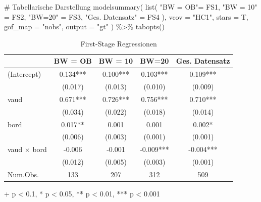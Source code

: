 \documentclass[
  a4paper,
  DIV=11,
  oneside]{scrreprt}
\newenvironment{Shaded}{\begin{snugshade}}{\end{snugshade}}
\newcommand{\AttributeTok}[1]{\textcolor[rgb]{0.40,0.45,0.13}{#1}}
\newcommand{\CommentTok}[1]{\textcolor[rgb]{0.37,0.37,0.37}{#1}}
\newcommand{\FunctionTok}[1]{\textcolor[rgb]{0.28,0.35,0.67}{#1}}
\newcommand{\NormalTok}[1]{\textcolor[rgb]{0.00,0.23,0.31}{#1}}
\newcommand{\OtherTok}[1]{\textcolor[rgb]{0.00,0.23,0.31}{#1}}
\newcommand{\SpecialCharTok}[1]{\textcolor[rgb]{0.37,0.37,0.37}{#1}}
\newcommand{\StringTok}[1]{\textcolor[rgb]{0.13,0.47,0.30}{#1}}
\begin{document}
\begin{Shaded}
\begin{Highlighting}[]
\CommentTok{\# Tabellarische Darstellung}
\FunctionTok{modelsummary}\NormalTok{(}
  \FunctionTok{list}\NormalTok{(}
    \StringTok{"BW = OB"}\OtherTok{=}\NormalTok{ FS1, }
    \StringTok{"BW = 10"} \OtherTok{=}\NormalTok{ FS2, }
    \StringTok{"BW=20"} \OtherTok{=}\NormalTok{ FS3, }
    \StringTok{"Ges. Datensatz"} \OtherTok{=}\NormalTok{ FS4}
\NormalTok{  ), }
  \AttributeTok{vcov =} \StringTok{"HC1"}\NormalTok{, }
  \AttributeTok{stars =}\NormalTok{ T, }
  \AttributeTok{gof\_map =} \StringTok{"nobs"}\NormalTok{, }
  \AttributeTok{output =} \StringTok{"gt"}
\NormalTok{) }\SpecialCharTok{\%\textgreater{}\%}
  \FunctionTok{tabopts}\NormalTok{()}
\end{Highlighting}
\end{Shaded}

\hypertarget{tbl-BastenBetzFS}{}
{
\makeatletter
\def\LT@makecaption#1#2#3{%
  \noalign{\smash{\hbox{\kern\textwidth\rlap{\kern\marginparsep
  \parbox[t]{\marginparwidth}{%
    \footnotesize{%
      \vspace{(1.1\baselineskip)}
    #1{#2: }\ignorespaces #3}}}}}}%
    }
\makeatother

\setlength{\LTpost}{0mm}
\begin{longtable}{lcccc}
\caption{\label{tbl-BastenBetzFS}First-Stage Regressionen }\tabularnewline

\toprule
  & BW = OB & BW = 10 & BW=20 & Ges. Datensatz \\ 
\midrule\addlinespace[2.5pt]
(Intercept) & 0.134*** & 0.100*** & 0.103*** & 0.109*** \\ 
 & (0.017) & (0.013) & (0.010) & (0.009) \\ 
vaud & 0.671*** & 0.726*** & 0.756*** & 0.710*** \\ 
 & (0.034) & (0.022) & (0.018) & (0.014) \\ 
bord & 0.017** & 0.001 & 0.001 & 0.002* \\ 
 & (0.006) & (0.003) & (0.001) & (0.001) \\ 
vaud × bord & -0.006 & -0.001 & -0.009*** & -0.004*** \\ 
 & (0.012) & (0.005) & (0.003) & (0.001) \\ 
Num.Obs. & 133 & 207 & 312 & 509 \\ 
\bottomrule
\end{longtable}
\begin{minipage}{\linewidth}
+ p < 0.1, * p < 0.05, ** p < 0.01, *** p < 0.001\\
\end{minipage}

}
\end{document}
